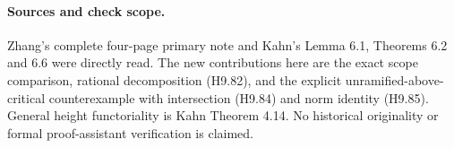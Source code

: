 \paragraph{Sources and check scope.}
Zhang's complete four-page primary note and Kahn's Lemma 6.1,
Theorems 6.2 and 6.6 were directly read. The new contributions here
are the exact scope comparison, rational decomposition (H9.82),
and the explicit unramified-above-critical counterexample with
intersection (H9.84) and norm identity (H9.85). General height
functoriality is Kahn Theorem 4.14. No historical originality or
formal proof-assistant verification is claimed.
